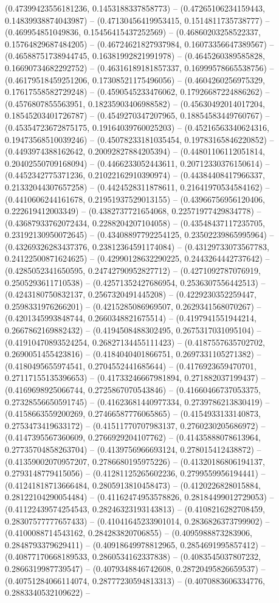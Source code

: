 (0.47399423556181236, 0.1453188337858773) -- (0.47265106234159443, 0.14839938874043987) -- (0.47130456419953415, 0.1514811735738777) -- (0.469954851049836, 0.15456415437252569) -- (0.46860203258522337, 0.15764829687484205) -- (0.46724621827937984, 0.16073356647389567) -- (0.46588751738944745, 0.16381992821991978) -- (0.4645260389585828, 0.16690734682292752) -- (0.46316189181857337, 0.16999578665538756) -- (0.46179518459251206, 0.17308521175496056) -- (0.4604260256975329, 0.17617558582729248) -- (0.4590545233476062, 0.17926687224886262) -- (0.4576807855563951, 0.18235903406988582) -- (0.45630492014017204, 0.18545203401726787) -- (0.4549270347207965, 0.18854583449760767) -- (0.45354723672875175, 0.19164039760025203) -- (0.45216563340624316, 0.19473568510039246) -- (0.45078233181035454, 0.19783165846220852) -- (0.4493974388162642, 0.20092827884205394) -- (0.44801106112051814, 0.20402550709168094) -- (0.4466233052443611, 0.20712330376150614) -- (0.4452342775371236, 0.21022162910390974) -- (0.44384408417966337, 0.21332044307657258) -- (0.4424528311878611, 0.21641970534584162) -- (0.4410606244161678, 0.21951937529013155) -- (0.43966756956120406, 0.222619412003349) -- (0.4382737721654068, 0.22571977429834778) -- (0.43687933762072434, 0.2288204207104058) -- (0.43548437117235705, 0.23192130950072645) -- (0.43408897792254125, 0.23502239865995964) -- (0.43269326283437376, 0.23812364591174084) -- (0.43129733073567783, 0.24122500871624625) -- (0.42990128632290225, 0.2443264442737642) -- (0.4285052341650595, 0.24742790952827712) -- (0.4271092787076919, 0.2505293611710538) -- (0.42571352427686954, 0.2536307556442513) -- (0.4243180750832137, 0.2567320491445208) -- (0.4229230352259447, 0.2598331976266201) -- (0.4215285086969507, 0.2629341568070267) -- (0.4201345993848744, 0.2660348821675514) -- (0.4197941551944214, 0.2667862169882432) -- (0.4194508488302495, 0.2675317031095104) -- (0.41910470893524254, 0.26827134455111423) -- (0.4187557635702702, 0.2690051455423816) -- (0.4184040401866751, 0.2697331105271382) -- (0.4180495655974541, 0.2704552441685644) -- (0.4176923659470701, 0.27117155135396653) -- (0.41733246667981894, 0.271882037199437) -- (0.4169698925066744, 0.2725867070543846) -- (0.41660466737053375, 0.27328556650591745) -- (0.41623681440977334, 0.2739786213830419) -- (0.4158663559200269, 0.27466587776065865) -- (0.4154933133140873, 0.2753473419633172) -- (0.41511770707983137, 0.2760230205686972) -- (0.4147395567360609, 0.2766929204107762) -- (0.41435888078613964, 0.27735704858263704) -- (0.4139756966693124, 0.278015412438872) -- (0.41359002070957207, 0.2786680195975226) -- (0.41320186806194137, 0.2793148779415056) -- (0.41281125265602236, 0.2799559956194441) -- (0.41241818713666484, 0.2805913810458473) -- (0.4120226828015884, 0.28122104290054484) -- (0.41162474953578826, 0.28184499012729053) -- (0.41122439574254543, 0.28246323193143813) -- (0.4108216282708459, 0.28307577777657433) -- (0.41041645233901014, 0.2836826373799902) -- (0.4100088714543162, 0.284283820706855) -- (0.4095988873283906, 0.2848793379629411) -- (0.40918649978812965, 0.2854691995857412) -- (0.40877170668189533, 0.2860534162337838) -- (0.4083545037807232, 0.2866319987739547) -- (0.4079348846742608, 0.28720495826659537) -- (0.40751284066114074, 0.28777230594813313) -- (0.4070883606334776, 0.2883340532109622) -- 